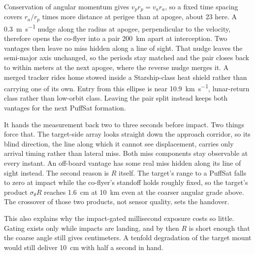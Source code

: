 \documentclass{article}
\begin{document}
Conservation of angular momentum gives $v_p r_p = v_a r_a$, so a fixed time spacing covers $r_a/r_p$ times more distance at perigee than at apogee, about 23 here. A \SI{0.3}{\meter\per\second} nudge along the radius at apogee, perpendicular to the velocity, therefore opens the co-flyer into a pair \SI{200}{\kilo\meter} apart at interception. Two vantages then leave no miss hidden along a line of sight. That nudge leaves the semi-major axis unchanged, so the periods stay matched and the pair closes back to within meters at the next apogee, where the reverse nudge merges it. A merged tracker rides home stowed inside a Starship-class heat shield rather than carrying one of its own. Entry from this ellipse is near \SI{10.9}{\kilo\meter\per\second}, lunar-return class rather than low-orbit class. Leaving the pair split instead keeps both vantages for the next PuffSat formation.

It hands the measurement back two to three seconds before impact. Two things force that. The target-side array looks straight down the approach corridor, so its blind direction, the line along which it cannot see displacement, carries only arrival timing rather than lateral miss. Both miss components stay observable at every instant. An off-board vantage has some real miss hidden along its line of sight instead. The second reason is $R$ itself. The target's range to a PuffSat falls to zero at impact while the co-flyer's standoff holds roughly fixed, so the target's product $\sigma_\theta R$ reaches \SI{1.6}{\centi\meter} at \SI{10}{\kilo\meter} even at the coarser angular grade above. The crossover of those two products, not sensor quality, sets the handover.

This also explains why the impact-gated millisecond exposure costs so little. Gating exists only while impacts are landing, and by then $R$ is short enough that the coarse angle still gives centimeters. A tenfold degradation of the target mount would still deliver \SI{10}{\centi\meter} with half a second in hand.
\end{document}
